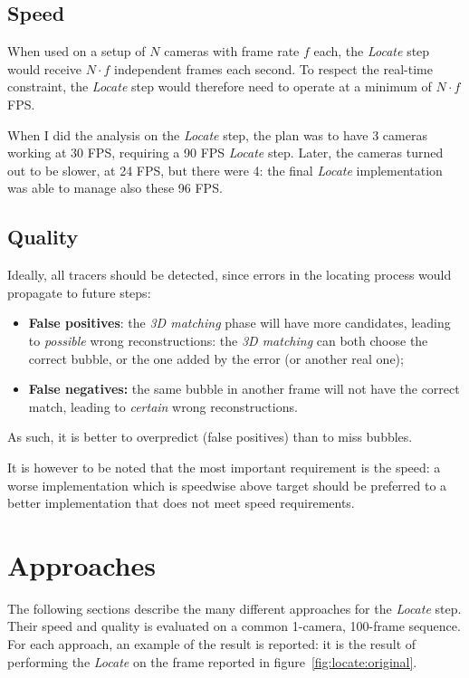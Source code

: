 \subsection{Speed}

When used on a setup of $N$ cameras with frame rate $f$ each, the \textit{Locate} step would receive $N{\cdot}f$ independent frames each second.
To respect the real-time constraint, the \textit{Locate} step would therefore need to operate at a minimum of $N{\cdot}f$ FPS.

When I did the analysis on the \textit{Locate} step, the plan was to have 3 cameras working at 30 FPS, requiring a 90 FPS \textit{Locate} step.
Later, the cameras turned out to be slower, at 24 FPS, but there were 4: the final \textit{Locate} implementation was able to manage also these 96 FPS.

\subsection{Quality}

Ideally, all tracers should be detected, since errors in the locating process would propagate to future steps:
\begin{itemize}
	\itemsep 0em
	\item \textbf{False positives}: the \textit{3D matching} phase will have more candidates, leading to \textit{possible} wrong reconstructions: the \textit{3D matching} can both choose the correct bubble, or the one added by the error (or another real one);
	\item \textbf{False negatives:} the same bubble in another frame will not have the correct match, leading to \textit{certain} wrong reconstructions.
\end{itemize}
As such, it is better to overpredict (false positives) than to miss bubbles.

It is however to be noted that the most important requirement is the speed: a worse implementation which is speedwise above target should be preferred to a better implementation that does not meet speed requirements.

\section{Approaches}

The following sections describe the many different approaches for the \textit{Locate} step.
Their speed and quality is evaluated on a common 1-camera, 100-frame sequence.
For each approach, an example of the result is reported: it is the result of performing the \textit{Locate} on the frame reported in figure~\ref{fig:locate:original}.

